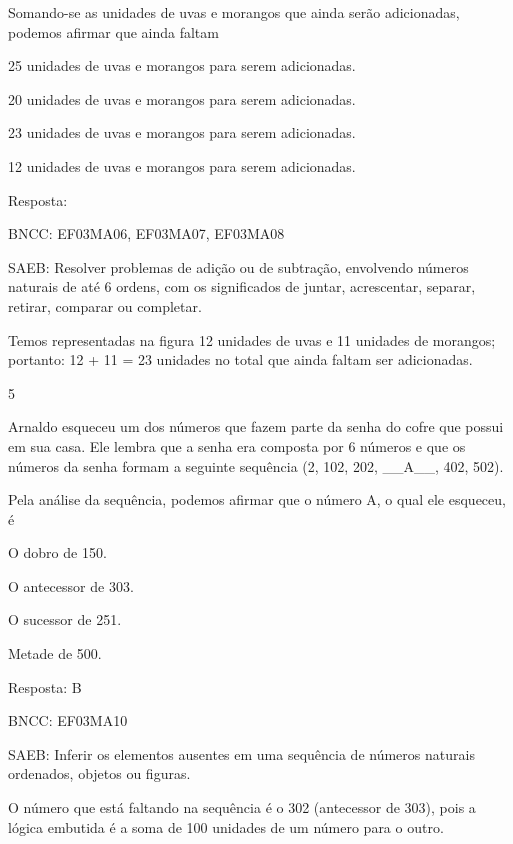 \begin{escolha}
{\begin{escolha}
{Somando-se as unidades de uvas e morangos que ainda serão adicionadas, podemos afirmar que ainda faltam

\begin{escolha}

\item
  25 unidades de uvas e morangos para serem adicionadas.
\item
  20 unidades de uvas e morangos para serem adicionadas.
\item
  23 unidades de uvas e morangos para serem adicionadas.
\item
  12 unidades de uvas e morangos para serem adicionadas.
\end{escolha}

Resposta:

BNCC: EF03MA06, EF03MA07, EF03MA08

SAEB: Resolver problemas de adição ou de subtração,
envolvendo números naturais de até 6 ordens, com os significados de
juntar, acrescentar, separar, retirar, comparar ou completar.

Temos representadas na figura 12 unidades de uvas e 11 unidades de
morangos; portanto: 12 + 11 = 23 unidades no total que ainda faltam ser
adicionadas.

\num{5}

Arnaldo esqueceu um dos números que fazem parte da senha do cofre que
possui em sua casa. Ele lembra que a senha era composta por 6 números e
que os números da senha formam a seguinte sequência (2, 102, 202,
\_\_A\_\_, 402, 502).

Pela análise da sequência, podemos afirmar que o número A, o qual ele esqueceu, é

\begin{escolha}

\item
  O dobro de 150.
\item
  O antecessor de 303.
\item
  O sucessor de 251.
\item
  Metade de 500.
\end{escolha}

Resposta: B

BNCC: EF03MA10

SAEB: Inferir os elementos ausentes em uma sequência de
números naturais ordenados, objetos ou figuras.

O número que está faltando na sequência é o 302 (antecessor de 303),
pois a lógica embutida é a soma de 100 unidades de um número para o
outro.

}
\end{escolha}}
\end{escolha}
